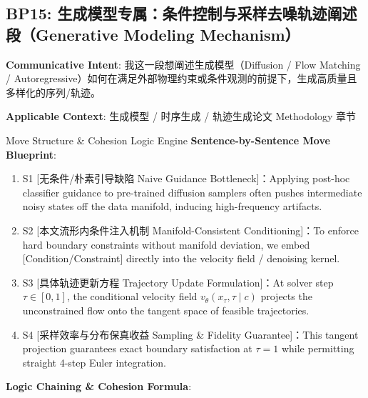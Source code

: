 \subsection{BP15: 生成模型专属：条件控制与采样去噪轨迹阐述段（Generative Modeling Mechanism）}\label{sec:bp:BP15}
\noindent\textbf{\color{AcadNavy}Communicative Intent}: 我这一段想阐述生成模型（Diffusion / Flow Matching / Autoregressive）如何在满足外部物理约束或条件观测的前提下，生成高质量且多样化的序列/轨迹。\par\vspace{2pt}
\noindent\textbf{\color{AcadSlate}Applicable Context}: 生成模型 / 时序生成 / 轨迹生成论文 Methodology 章节\par\vspace{4pt}
\begin{ConceptBox}{Move Structure \& Cohesion Logic Engine}
\textbf{Sentence-by-Sentence Move Blueprint}:
\begin{enumerate}[label=\textbf{\color{AcadNavy}S\arabic*.}, leftmargin=2em, itemsep=2pt]
  \item S1 [无条件/朴素引导缺陷 Naive Guidance Bottleneck]：Applying post-hoc classifier guidance to pre-trained diffusion samplers often pushes intermediate noisy states off the data manifold, inducing high-frequency artifacts.
  \item S2 [本文流形内条件注入机制 Manifold-Consistent Conditioning]：To enforce hard boundary constraints without manifold deviation, we embed [Condition/Constraint] directly into the velocity field / denoising kernel.
  \item S3 [具体轨迹更新方程 Trajectory Update Formulation]：At solver step $\tau \in [0, 1]$, the conditional velocity field $v_\theta(x_\tau, \tau \mid c)$ projects the unconstrained flow onto the tangent space of feasible trajectories.
  \item S4 [采样效率与分布保真收益 Sampling \& Fidelity Guarantee]：This tangent projection guarantees exact boundary satisfaction at $\tau=1$ while permitting straight 4-step Euler integration.
\end{enumerate}\par\vspace{4pt}
\textbf{Logic Chaining \& Cohesion Formula}:\par{}
\end{ConceptBox}
